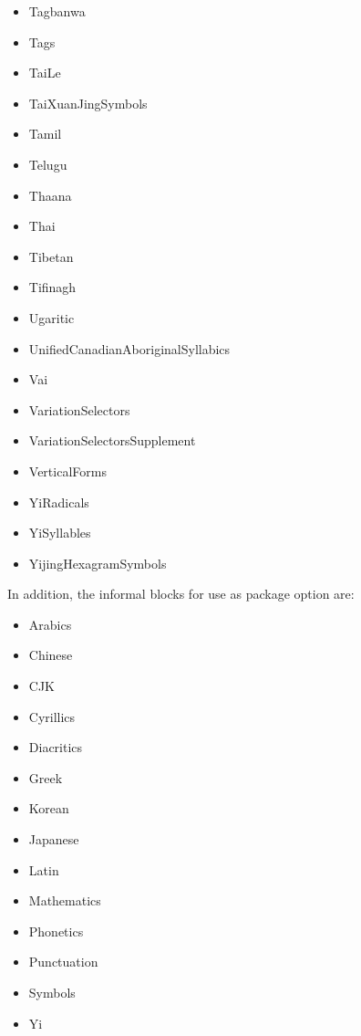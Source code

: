 ﻿\documentclass{article}
\newenvironment{itemlist}{%
  \begin{itemize}
	\setlength{\itemsep}{0pt}
	\setlength{\parsep}{0pt}
	\setlength{\topsep}{0pt}
	\setlength{\partopsep}{0pt}
	\setlength{\parskip}{0pt}
	\setlength{\labelsep}{5pt}}%
{
  \end{itemize}}
\begin{document}
\begin{multicols}{2}
\begin{itemlist}
				\item Tagbanwa
				\item Tags
				\item TaiLe
				\item TaiXuanJingSymbols
				\item Tamil
				\item Telugu
				\item Thaana
				\item Thai
				\item Tibetan
				\item Tifinagh
				\item Ugaritic
				\item UnifiedCanadianAboriginalSyllabics
				\item Vai
				\item VariationSelectors
				\item VariationSelectorsSupplement
				\item VerticalForms
				\item YiRadicals
				\item YiSyllables
				\item YijingHexagramSymbols
			\end{itemlist}
		\end{multicols}

		In addition, the informal blocks for use as package option are:
		
		\begin{itemlist}
			\item Arabics
			\item Chinese
			\item CJK
			\item Cyrillics
			\item Diacritics
			\item Greek
			\item Korean
			\item Japanese
			\item Latin
			\item Mathematics
			\item Phonetics
			\item Punctuation
			\item Symbols
			\item Yi
		\end{itemlist}
			
\end{document}
